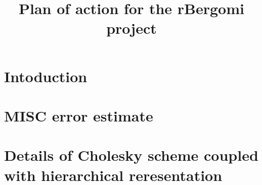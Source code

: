 \documentclass[11pt]{article}
\title{Plan of action for the rBergomi project}
\begin{document}
\maketitle







\thispagestyle{plain}

\setcounter{tocdepth}{1}

\section{Intoduction}\label{sec:Intoduction}




 \section{MISC error estimate}\label{sec:MISC error estimate}



\section{Details of Cholesky scheme coupled with hierarchical reresentation}\label{sec:Details of Cholesky scheme coupled with hierarchical reresentation}










%
% 







 

 

 
 
 
\end{document}
